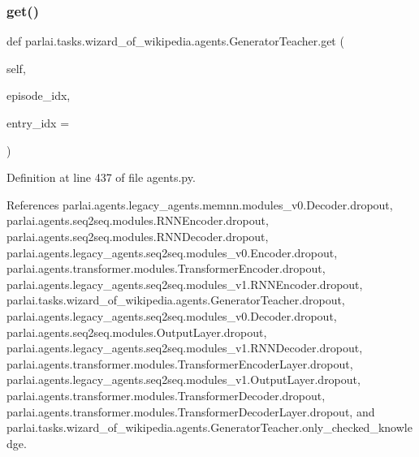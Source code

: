 \mbox{\label{classparlai_1_1tasks_1_1wizard__of__wikipedia_1_1agents_1_1GeneratorTeacher_abf361a076410dda7b42127be420611d9}} 
\subsubsection{\texorpdfstring{get()}{get()}}
{\footnotesize\ttfamily def parlai.\+tasks.\+wizard\+\_\+of\+\_\+wikipedia.\+agents.\+Generator\+Teacher.\+get (\begin{DoxyParamCaption}\item[{}]{self,  }\item[{}]{episode\+\_\+idx,  }\item[{}]{entry\+\_\+idx = {} }\end{DoxyParamCaption})}



Definition at line 437 of file agents.\+py.



References parlai.\+agents.\+legacy\+\_\+agents.\+memnn.\+modules\+\_\+v0.\+Decoder.\+dropout, parlai.\+agents.\+seq2seq.\+modules.\+R\+N\+N\+Encoder.\+dropout, parlai.\+agents.\+seq2seq.\+modules.\+R\+N\+N\+Decoder.\+dropout, parlai.\+agents.\+legacy\+\_\+agents.\+seq2seq.\+modules\+\_\+v0.\+Encoder.\+dropout, parlai.\+agents.\+transformer.\+modules.\+Transformer\+Encoder.\+dropout, parlai.\+agents.\+legacy\+\_\+agents.\+seq2seq.\+modules\+\_\+v1.\+R\+N\+N\+Encoder.\+dropout, parlai.\+tasks.\+wizard\+\_\+of\+\_\+wikipedia.\+agents.\+Generator\+Teacher.\+dropout, parlai.\+agents.\+legacy\+\_\+agents.\+seq2seq.\+modules\+\_\+v0.\+Decoder.\+dropout, parlai.\+agents.\+seq2seq.\+modules.\+Output\+Layer.\+dropout, parlai.\+agents.\+legacy\+\_\+agents.\+seq2seq.\+modules\+\_\+v1.\+R\+N\+N\+Decoder.\+dropout, parlai.\+agents.\+transformer.\+modules.\+Transformer\+Encoder\+Layer.\+dropout, parlai.\+agents.\+legacy\+\_\+agents.\+seq2seq.\+modules\+\_\+v1.\+Output\+Layer.\+dropout, parlai.\+agents.\+transformer.\+modules.\+Transformer\+Decoder.\+dropout, parlai.\+agents.\+transformer.\+modules.\+Transformer\+Decoder\+Layer.\+dropout, and parlai.\+tasks.\+wizard\+\_\+of\+\_\+wikipedia.\+agents.\+Generator\+Teacher.\+only\+\_\+checked\+\_\+knowledge.

